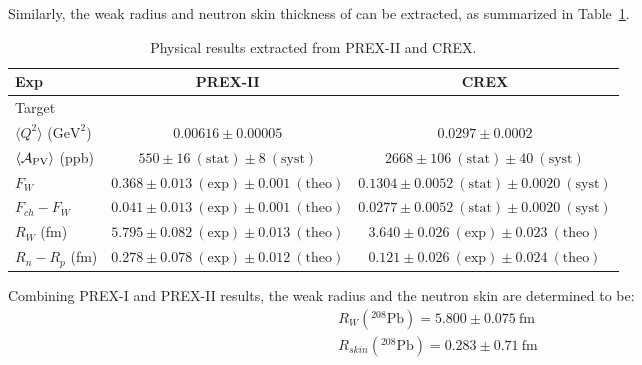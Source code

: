 Similarly, the weak radius and neutron skin thickness of \Ca can be extracted,
as summarized in Table~\ref{tab:pcrex_neutron_skin}.
\begin{table}[!h]
    \centering
    \begin{tabular}{l | c c}
	\hline
	Exp	& PREX-II   & CREX  \\
	\hline
	Target	& \Pb	    & \Ca   \\
	$\langle Q^2 \rangle $ ($\mathrm{GeV}^2$)	& $ 0.00616 \pm 0.00005 $   & $0.0297 \pm 0.0002 $  \\
	$\langle \mathcal{A}_{\text{PV}} \rangle$ (ppb)   & $550 \pm 16 \ (\text{stat}) \pm 8 \ (\text{syst})$	& $2668 \pm 106 \ (\text{stat}) \pm 40 \ (\text{syst})$ \\
	$F_W$	& $0.368 \pm 0.013 \ (\text{exp}) \pm 0.001 \ (\text{theo})$    & $0.1304 \pm 0.0052 \ (\text{stat}) \pm 0.0020 \ (\text{syst})$    \\
	$F_{ch} - F_W$	& $0.041 \pm 0.013 \ (\text{exp}) \pm 0.001 \ (\text{theo})$    & $0.0277 \pm 0.0052 \ (\text{stat}) \pm 0.0020 \ (\text{syst})$    \\
	$R_W$ (fm)	& $5.795 \pm 0.082 \ (\text{exp}) \pm 0.013 \ (\text{theo})$    & $3.640 \pm 0.026 \ (\text{exp}) \pm 0.023 \ (\text{theo})$\\
	$R_n - R_p$ (fm)  & $0.278 \pm 0.078 \ (\text{exp}) \pm 0.012 \ (\text{theo})$	& $0.121 \pm 0.026 \ (\text{exp}) \pm 0.024 \ (\text{theo})$    \\
	\hline
    \end{tabular}
    \caption{Physical results extracted from PREX-II and CREX. 
    }
    \label{tab:pcrex_neutron_skin}
\end{table}

Combining PREX-I and PREX-II results, the weak radius and the neutron skin are 
determined to be:
\begin{equation}
    \begin{gathered}
	R_W({}^{208}\text{Pb}) = 5.800 \pm 0.075\ \mathrm{fm}  \\
	R_{skin}({}^{208}\text{Pb}) = 0.283 \pm 0.71\ \mathrm{fm}   \\
    \end{gathered}
\end{equation}
